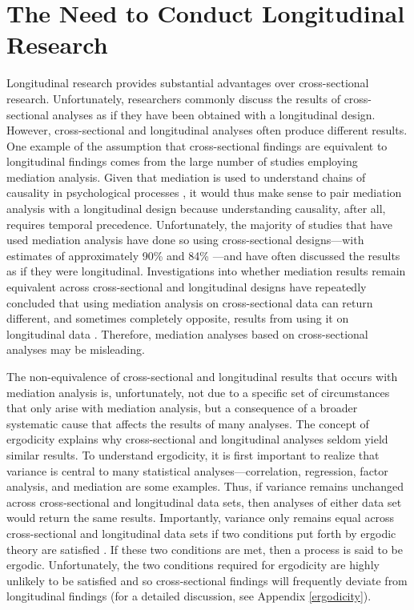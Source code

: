 \documentclass[
12pt, %
twoside,
english]{guelphthesis}
\begin{document}
\hypertarget{the-need-to-conduct-longitudinal-research}{%
\section{The Need to Conduct Longitudinal Research}\label{the-need-to-conduct-longitudinal-research}}

Longitudinal research provides substantial advantages over cross-sectional research. Unfortunately, researchers commonly discuss the results of cross-sectional analyses as if they have been obtained with a longitudinal design. However, cross-sectional and longitudinal analyses often produce different results. One example of the assumption that cross-sectional findings are equivalent to longitudinal findings comes from the large number of studies employing mediation analysis. Given that mediation is used to understand chains of causality in psychological processes \autocite{baron1986}, it would thus make sense to pair mediation analysis with a longitudinal design because understanding causality, after all, requires temporal precedence. Unfortunately, the majority of studies that have used mediation analysis have done so using cross-sectional designs---with estimates of approximately 90\% \autocite{maxwell2007} and 84\% \autocite{mitchell2013}---and have often discussed the results as if they were longitudinal. Investigations into whether mediation results remain equivalent across cross-sectional and longitudinal designs have repeatedly concluded that using mediation analysis on cross-sectional data can return different, and sometimes completely opposite, results from using it on longitudinal data \autocite{cole2003,maxwell2007,maxwell2011,mitchell2013,olaughlin2018}. Therefore, mediation analyses based on cross-sectional analyses may be misleading.

The non-equivalence of cross-sectional and longitudinal results that occurs with mediation analysis is, unfortunately, not due to a specific set of circumstances that only arise with mediation analysis, but a consequence of a broader systematic cause that affects the results of many analyses. The concept of ergodicity explains why cross-sectional and longitudinal analyses seldom yield similar results. To understand ergodicity, it is first important to realize that variance is central to many statistical analyses---correlation, regression, factor analysis, and mediation are some examples. Thus, if variance remains unchanged across cross-sectional and longitudinal data sets, then analyses of either data set would return the same results. Importantly, variance only remains equal across cross-sectional and longitudinal data sets if two conditions put forth by ergodic theory are satisfied \autocites[homogeneity and stationarity;][]{molenaar2004,molenaar2009}. If these two conditions are met, then a process is said to be ergodic. Unfortunately, the two conditions required for ergodicity are highly unlikely to be satisfied and so cross-sectional findings will frequently deviate from longitudinal findings (for a detailed discussion, see Appendix \ref{ergodicity}).
\end{document}
